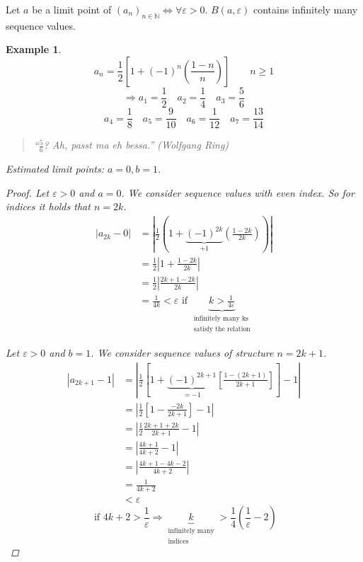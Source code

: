 \documentclass[a4paper,landscape,twocolumn]{article}
\newtheorem{ex}{Example}
\newcommand\abs[1]{\left|#1\right|}
\newcommand\seq[1]{{\left(#1\right)}_{n \in \mathbb N}}
\begin{document}
Let $a$ be a limit point of $\seq{a_n} \Leftrightarrow \forall \varepsilon > 0$.
$B(a, \varepsilon)$ contains infinitely many sequence values.

\begin{ex}
  \[ a_n = \frac12 \left[1 + (-1)^n \left(\frac{1-n}{n}\right)\right] \qquad n \geq 1 \]
  \[ \Rightarrow a_1 = \frac12 \quad a_2 = \frac14 \quad a_3 = \frac56 \]
  \[ a_4 = \frac18 \quad a_5 = \frac{9}{10} \quad a_6 = \frac{1}{12} \quad a_7 = \frac{13}{14} \]
  \begin{quote}
    \foreignlanguage{ngerman}{\enquote{$\frac56$? Ah, passt ma eh bessa.} (Wolfgang Ring)}
  \end{quote}

  Estimated limit points: $a = 0, b = 1$.

  \begin{proof}
    Let $\varepsilon > 0$ and $a = 0$. We consider sequence values with even index.
    So for indices it holds that $n = 2k$.
    \begin{align*}
      \abs{a_{2k} - 0}
        &= \abs{\frac12(1 + \underbrace{(-1)^{2k}}_{+1} \left(\frac{1-2k}{2k}\right))} \\
        &= \frac12 \abs{1 + \frac{1-2k}{2k}} \\
        &= \frac12 \abs{\frac{2k + 1 - 2k}{2k}} \\
        &= \frac1{4k} < \varepsilon \text{ if } \underbrace{k > \frac{1}{4\varepsilon}}_{\substack{\text{infinitely many ks} \\ \text{satisfy the relation}}}
    \end{align*}

    Let $\varepsilon > 0$ and $b = 1$. We consider sequence values of structure $n = 2k+1$.
    \begin{align*}
      \abs{a_{2k+1} - 1}
        &= \abs{\frac12 \left[1 + \underbrace{(-1)^{2k+1}}_{=-1} \left[\frac{1 - (2k+1)}{2k+1}\right]\right] - 1} \\
        &= \abs{\frac12 \left[1 - \frac{-2k}{2k+1}\right] - 1} \\
        &= \abs{\frac12 \frac{2k+1+2k}{2k+1} - 1} \\
        &= \abs{\frac{4k+1}{4k+2} - 1} \\
        &= \abs{\frac{4k+1 - 4k-2}{4k+2}} \\
        &= \frac{1}{4k+2} \\
        &< \varepsilon
    \end{align*}
    \[ \text{ if } 4k+2 > \frac1\varepsilon \Rightarrow \underbrace{k}_{\substack{\text{infinitely many} \\ \text{indices}}} > \frac14 \left(\frac1\varepsilon - 2\right) \]
  \end{proof}
\end{ex}
\end{document}
